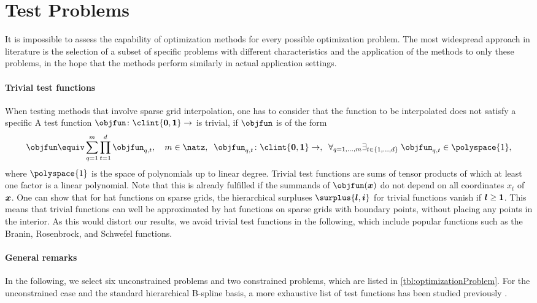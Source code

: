 \section{Test Problems}
\label{sec:52testProblems}

It is impossible to assess the capability of optimization methods
for every possible optimization problem.
The most widespread approach in literature
is the selection of a subset of specific problems
with different characteristics  and
the application of the methods to only these problems,
in the hope that the methods perform similarly in
actual application settings.

\paragraph{Trivial test functions}

When testing methods that involve sparse grid interpolation,
one has to consider that the function to be interpolated
does not satisfy a specific 
A test function $\objfun\colon \clint{\*0, \*1} \to \real$ is trivial, if
$\objfun$ is of the form
\begin{equation}
  \objfun \equiv \sum_{q=1}^m \prod_{t=1}^d \objfun_{q,t},\quad
  m \in \natz,\;\;
  \objfun_{q,t}\colon \clint{\*0, \*1} \to \real,\;\;
  \faex{q = 1, \dotsc, m}{t \in \{1, \dotsc, d\}}{
    \objfun_{q,t} \in \polyspace{1},
  }
\end{equation}
where $\polyspace{1}$ is the space of polynomials up to linear degree.
Trivial test functions are sums of tensor products of which at
least one factor is a linear polynomial.
Note that this is already fulfilled if the summands of $\objfun(\*x)$
do not depend on all coordinates $x_t$ of ${\boldsymbol{x}}$.
One can show that for hat functions on sparse grids,
the hierarchical surpluses $\surplus{\*l,\*i}$ for trivial functions
vanish if ${\boldsymbol{l}} \ge {\boldsymbol{1}}$.
This means that trivial functions can well be approximated by hat functions
on sparse grids with boundary points, without placing any points
in the interior.
As this would distort our results,
we avoid trivial test functions in the following,
which include popular functions such as the
Branin, Rosenbrock, and Schwefel functions.

\paragraph{General remarks}

In the following, we select six unconstrained problems
and two constrained problems, which are listed in
\cref{tbl:optimizationProblem}.
For the unconstrained case and the standard hierarchical
B-spline basis, a more exhaustive list of test functions has been
studied previously \cite{Valentin14Hierarchische}.

